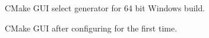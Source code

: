 \documentclass[fleqn,12pt,openany]{book}
\begin{document}
\begin{figure}[H]
\caption{CMake GUI select generator for 64 bit Windows build.}
\label{fig:cmake-gui-windows2_64}
\end{figure}

\begin{figure}[H]
\caption{CMake GUI after configuring for the first time.}
\end{figure}
\end{document}
